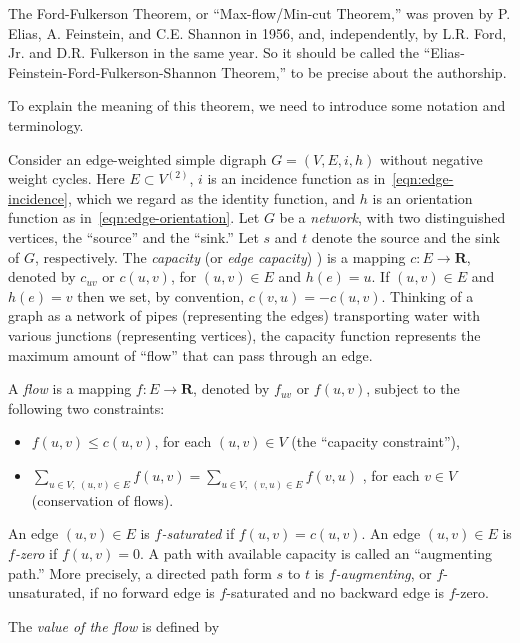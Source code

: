 The Ford-Fulkerson Theorem, or ``Max-flow/Min-cut Theorem,''
was proven by P. Elias, A. Feinstein, and C.E. Shannon in 1956, and,
independently, by L.R. Ford, Jr.  and D.R. Fulkerson in the same year.
So it should be called the
``Elias-Feinstein-Ford-Fulkerson-Shannon Theorem,''
to be precise about the authorship.

To explain the meaning of this theorem, we need to introduce some
notation and  terminology.

Consider an edge-weighted simple
digraph $G=(V,E,i,h)$ without negative weight
cycles. Here $E\subset V^{(2)}$,
$i$ is an incidence function as in~\eqref{eqn:edge-incidence}, which
we regard as the identity function, and $h$ is an
orientation function as in~\eqref{eqn:edge-orientation}.
Let $G$ be a {\it network},
with two distinguished vertices, the ``source'' and the ``sink.''
Let $s$ and $t$ denote the source and the sink of $G$, respectively.
The {\it capacity} (or {\it edge capacity})
)
is a mapping $c: E \to {\mathbf{R}}$, denoted by $c_{uv}$
or $c(u,v)$, for $(u,v)\in E$ and $h(e)= u$.
If $(u,v)\in E$ and $h(e)= v$
then we set, by convention, $c(v,u)=-c(u,v)$.
Thinking of a graph as a network of pipes (representing the edges)
transporting water with various junctions (representing vertices),
the capacity function represents the maximum amount
of ``flow'' that can pass through an edge.

A {\it flow}
is a mapping $f: E \to {\mathbf{R}}$, denoted by $f_{uv}$ or
$f(u,v)$, subject to the following two constraints:
\begin{itemize}
\item
$f(u,v)\leq c(u,v)$, for each $(u,v) \in V$ (the ``capacity constraint''),
\item
$\sum_{u\in V,\ (u,v)\in E} f(u,v) = \sum_{u\in V,\ (v, u)\in E} f(v, u)$ ,
for each $v\in V$ (conservation of flows).
\end{itemize}
An edge $(u,v) \in E$ is {\it $f$-saturated}
if $f(u,v)=c(u,v)$.
An edge $(u,v) \in E$ is {\it $f$-zero} if $f(u,v)=0$.
A path with available capacity is called an ``augmenting path.''
More precisely, a directed path form $s$ to $t$ is
{\it $f$-augmenting}, or
$f$-unsaturated, if no forward
edge is $f$-saturated and no backward edge is $f$-zero.

The {\it value of the flow} is defined by

